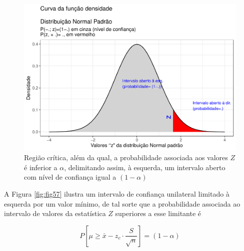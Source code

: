 \documentclass[
]{book}
\begin{document}
\begin{figure}

{\centering \includegraphics[width=1\linewidth]{apostila_files/figure-latex/fig56-1} 

}

\caption{Região crítica, além da qual, a probabilidade associada aos valores $Z$ é inferior a $\alpha$, delimitando assim, à esquerda, um intervalo aberto com nível de confiança igual a $(1-\alpha)$}\label{fig:fig56}
\end{figure}

\hfill\break

A Figura \ref{fig:fig57} ilustra um intervalo de confiança unilateral limitado à esquerda por um valor mínimo, de tal sorte que a probabilidade associada ao intervalo de valores da estatística \(Z\) superiores a esse limitante é

\hfill\break

\[
P\left [\mu \ge \bar{x} - {z}_{c} \cdot  \frac{S}{\sqrt{n}} \right ] = (1- \alpha)
\]

\hfill\break
\end{document}
